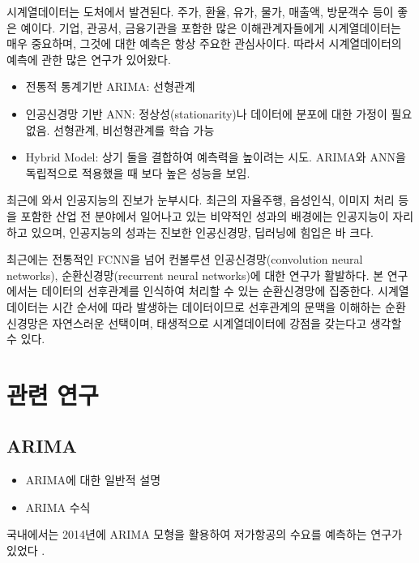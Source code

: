 \documentclass[a4paper, amsmath, 10pt, twocolumn]{oblivoir}
\begin{document}
시계열데이터는 도처에서 발견된다. 주가, 환율, 유가, 물가, 매출액, 방문객수 등이 좋은 예이다.  기업, 관공서, 금융기관을 포함한 많은 이해관계자들에게 시계열데이터는 매우 중요하며, 그것에 대한 예측은 항상 주요한 관심사이다.  따라서 시계열데이터의 예측에 관한 많은 연구가 있어왔다.   

\begin{itemize}
\item 전통적 통계기반 ARIMA: 선형관계 
\item 인공신경망 기반 ANN: 정상성(stationarity)나 데이터에 분포에 대한 가정이 필요 없음. 선형관계, 비선형관계를 학습 가능
\item Hybrid Model: 상기 둘을 결합하여 예측력을 높이려는 시도. ARIMA와 ANN을 독립적으로 적용했을 때 보다 높은 성능을 보임. 
\end{itemize}

최근에 와서 인공지능의 진보가 눈부시다.  최근의 자율주행, 음성인식, 이미지 처리 등을 포함한 산업 전 분야에서 일어나고 있는 비약적인 성과의 배경에는 인공지능이 자리하고 있으며, 인공지능의 성과는 진보한 인공신경망, 딥러닝에 힘입은 바 크다.

최근에는 전통적인 FCNN을 넘어 컨볼루션 인공신경망(convolution neural networks), 순환신경망(recurrent neural networks)에 대한 연구가 활발하다. 본 연구에서는 데이터의 선후관계를 인식하여 처리할 수 있는 순환신경망에 집중한다. 시계열데이터는 시간 순서에 따라 발생하는 데이터이므로 선후관계의 문맥을 이해하는 순환신경망은 자연스러운 선택이며, 태생적으로 시계열데이터에 강점을 갖는다고 생각할 수 있다.

    
\section{관련 연구}

\subsection{ARIMA}

\begin{itemize}
\item ARIMA에 대한 일반적 설명
\item ARIMA 수식
\end{itemize}

국내에서는 2014년에 ARIMA 모형을 활용하여 저가항공의 수요를 예측하는 연구가 있었다 \cite{kyj2014}.
  
\end{document}
